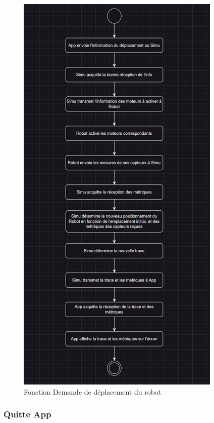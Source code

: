 \begin{figure}[H]
    \centering
    \includegraphics[scale=0.25]{data/function2.png}
    \caption{Fonction Demande de déplacement du robot}
    \label{fig:ihm_move}
\end{figure}

\subsubsection{Quitte App}


